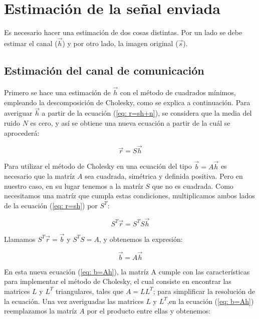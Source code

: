 \section{Estimaci\'on de la se\~nal enviada}

Es necesario hacer una estimaci\'on de dos cosas distintas. Por un lado se debe estimar el canal ($\vec{h}$) y por otro lado, la imagen original  ($\vec{s}$).

\subsection{Estimaci\'on del canal de comunicaci\'on}

Primero se hace una estimaci\'on de $\vec{h}$ con el m\'etodo de cuadrados m\'inimos, empleando la descomposici\'on de Cholesky, como se explica a continuaci\'on.  Para averiguar $\vec{h}$ a partir de la ecuaci\'on (\ref{eq: r=sh+n}), se considera que la media del ruido $N$ es cero, y as\'i se obtiene una nueva ecuaci\'on a partir de la cu\'al se aproceder\'a:

\begin{equation} 
\vec{r} = S \vec{h}
\label{eq: r=sh} 
\end{equation} 

Para utilizar el m\'etodo de Cholesky en una ecuaci\'on del tipo $\vec{b} = A \vec{h}$ es necesario que la matr\'iz $A$ sea cuadrada, sim\'etrica y definida positiva. Pero en nuestro caso,  en su lugar tenemos a la matr\'iz $S$ que no es  cuadrada. Como necesitamos una matr\'iz que cumpla estas condiciones, multiplicamos ambos lados de la ecuaci\'on (\ref{eq: r=sh}) por $S^T$:

\begin{equation} 
S^T \vec{r} = S^T S \vec{h} 
\end{equation} 

Llamamos  $S^T \vec{r} = \vec{b}$ y  $S^T S = A$, y obtenemos la expresi\'on:

\begin{equation} 
\vec{b} = A \vec{h} 
\label{eq: b=Ah} 
\end{equation} 

En esta nueva ecuaci\'on (\ref{eq: b=Ah}), la matr\'iz A cumple con las caracter\'isticas para implementar el m\'etodo de Cholesky, el cual consiste en encontrar las matrices $L$ y $L^T$ triangulares, tales que $A = L L^T$; para simplificar la resoluci\'on de la ecuaci\'on. Una vez averiguadas las matrices  $L$ y $L^T$,en la ecuaci\'on (\ref{eq: b=Ah}) reemplazamos la matr\'iz $A$ por el producto entre ellas y obtenemos:

